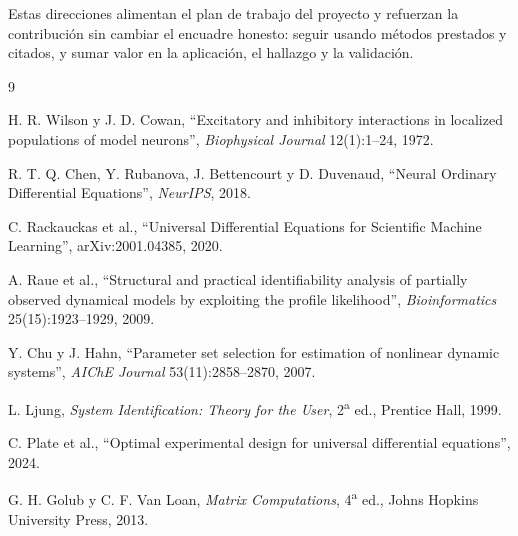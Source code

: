 \documentclass[11pt,a4paper]{article}
\begin{document}
\noindent Estas direcciones alimentan el plan de trabajo del proyecto y refuerzan
la contribución sin cambiar el encuadre honesto: seguir usando métodos prestados y
citados, y sumar valor en la aplicación, el hallazgo y la validación.

\begin{thebibliography}{9}

 H. R. Wilson y J. D. Cowan, ``Excitatory and inhibitory
interactions in localized populations of model neurons'', \emph{Biophysical
Journal} 12(1):1--24, 1972.

 R. T. Q. Chen, Y. Rubanova, J. Bettencourt y D. Duvenaud,
``Neural Ordinary Differential Equations'', \emph{NeurIPS}, 2018.

 C. Rackauckas et al., ``Universal Differential Equations
for Scientific Machine Learning'', arXiv:2001.04385, 2020.

 A. Raue et al., ``Structural and practical identifiability
analysis of partially observed dynamical models by exploiting the profile
likelihood'', \emph{Bioinformatics} 25(15):1923--1929, 2009.

 Y. Chu y J. Hahn, ``Parameter set selection for estimation
of nonlinear dynamic systems'', \emph{AIChE Journal} 53(11):2858--2870, 2007.

 L. Ljung, \emph{System Identification: Theory for the User},
2\textsuperscript{a} ed., Prentice Hall, 1999.

 C. Plate et al., ``Optimal experimental design for universal
differential equations'', 2024.

 G. H. Golub y C. F. Van Loan, \emph{Matrix Computations},
4\textsuperscript{a} ed., Johns Hopkins University Press, 2013.

\end{thebibliography}
\end{document}
